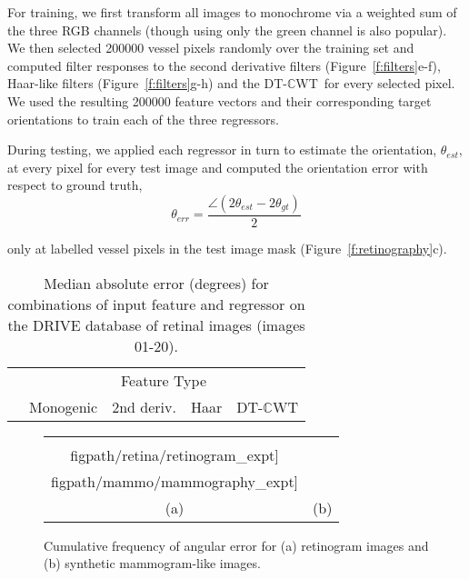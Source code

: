 \documentclass[10pt,twocolumn,letterpaper]{article}
\newcommand{\fref}[1]{Figure~\ref{#1}}
\def\dtcwt{DT-$\mathbb{C}$WT}
\newcommand{\comment}[1]{}
\begin{document}
For training, we first transform all images to monochrome via a weighted sum of the three RGB channels (though using only the green channel is also popular). We then selected 200000 vessel pixels randomly over the training set and computed filter responses to the second derivative filters (\fref{f:filters}e-f), Haar-like filters (\fref{f:filters}g-h) and the \dtcwt~for every selected pixel. We used the resulting 200000 feature vectors and their corresponding target orientations to train each of the three regressors.
\comment{Why 200k points? Was this limit dictated by system requirements?}

During testing, we applied each regressor in turn to estimate the orientation, $\theta_{est}$, at every pixel for every test image and computed the orientation error with respect to ground truth,
%
\begin{equation}
	\theta_{err} = \frac{\angle(2\theta_{est}-2\theta_{gt})}{2}
\end{equation}

\noindent only at labelled vessel pixels in the test image mask (\fref{f:retinography}c).\comment{A reviewer will probably complain that this is cheating and that we should have used a classifier}

\begin{table}[b]
\centering
\begin{tabular}{l|c c c c}
							& \multicolumn{4}{c}{Feature Type} \\
							& Monogenic		& 2nd deriv.	& Haar				& \dtcwt \\
\hline

\end{tabular}
%
\caption{Median absolute error (degrees) for combinations of input feature and regressor on the DRIVE database of retinal images (images 01-20).}
\label{t:retinopathy}
\end{table}
\comment{Why median error rather than mean?}
\comment{Some measure of spread for these figures, or a box plot to show significance.}

\begin{figure}
\centering
\begin{tabular}{c c}
\texttt{[image: \\figpath/retina/retinogram\_expt]} &
\texttt{[image: \\figpath/mammo/mammography\_expt]} \\
(a) & (b) \\
\end{tabular}
%
\caption{Cumulative frequency of angular error for (a) retinogram images and (b) synthetic mammogram-like images.}
\label{f:cumfreq}
\end{figure}
\end{document}
